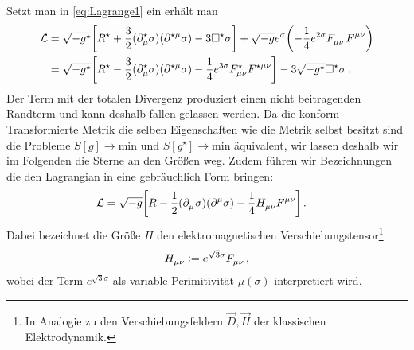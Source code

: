 Setzt man in \eqref{eq:Lagrange1} ein erhält man
\begin{equation}
\begin{split}
\mathcal{L}&=\sqrt{-g^\star}\left[R^\star
+\frac{3}{2}(\tensor*{\partial}{^\star_\mu}\sigma)(\tensor{\partial}{^\star^\mu}\sigma)
-3\square^\star\sigma\right]
+\sqrt{-g}e^{\sigma}\left(-\frac{1}{4}e^{2\sigma}\tensor{F}{_\mu_\nu}\tensor{F}{^\mu^\nu}\right)\\
&=\sqrt{-g^\star}\left[R^\star
-\frac{3}{2}(\tensor*{\partial}{^\star_\mu}\sigma)(\tensor{\partial}{^\star^\mu}\sigma)
-\frac{1}{4}e^{3\sigma}\tensor*{F}{^\star_\mu_\nu}\tensor*{F}{^\star^\mu^\nu}\right]-3\sqrt{-g^\star}\square^\star\sigma\,.
\end{split}
\end{equation}
Der Term mit der totalen Divergenz produziert einen nicht beitragenden Randterm
und kann deshalb fallen gelassen werden. 
Da die konform Transformierte Metrik die selben Eigenschaften wie die Metrik
selbst besitzt sind die Probleme $S[g]\to\text{min}$ und
$S\left[g^\star\right]\to\text{min}$ äquivalent, wir lassen deshalb wir im
Folgenden die Sterne an den Größen weg. 
Zudem führen wir Bezeichnungen die den Lagrangian in eine gebräuchlich Form
bringen:
\begin{equation}
\begin{split}
\mathcal{L}
&=\sqrt{-g}\left[R
-\frac{1}{2}(\tensor{\partial}{_\mu}\sigma)(\tensor{\partial}{^\mu}\sigma)
-\frac{1}{4}\tensor*{H}{_\mu_\nu}\tensor*{F}{^\mu^\nu}\right]\,.
\label{eq:Lagrange2}
\end{split}
\end{equation}
Dabei bezeichnet die
Größe $H$ den elektromagnetischen Verschiebungstensor\footnote{In Analogie zu
den Verschiebungsfeldern $\vec{D},\vec{H}$ der klassischen Elektrodynamik.
}
\begin{equation}
\tensor*{H}{_\mu_\nu}:=e^{\sqrt{3}\sigma}\tensor*{F}{_\mu_\nu}\,,
\end{equation}
wobei der Term $e^{\sqrt{3}\sigma}$ als variable Perimitivität $\mu(\sigma)$
interpretiert wird. 
